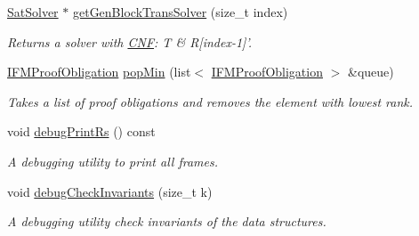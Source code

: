\begin{DoxyCompactItemize}
\hyperlink{classSatSolver}{Sat\-Solver} $\ast$ \hyperlink{classIFM13Synth_af087a4ddf9026bb48a752c03e539d9da}{get\-Gen\-Block\-Trans\-Solver} (size\-\_\-t index)
\begin{DoxyCompactList}\small\item\em Returns a solver with \hyperlink{classCNF}{C\-N\-F}\-: T \& R\mbox{[}index-\/1\mbox{]}'. \end{DoxyCompactList}\item 
\hyperlink{classIFMProofObligation}{I\-F\-M\-Proof\-Obligation} \hyperlink{classIFM13Synth_a6bd825fad36c8cd64afbc2b17fff8b69}{pop\-Min} (list$<$ \hyperlink{classIFMProofObligation}{I\-F\-M\-Proof\-Obligation} $>$ \&queue)
\begin{DoxyCompactList}\small\item\em Takes a list of proof obligations and removes the element with lowest rank. \end{DoxyCompactList}\item 
void \hyperlink{classIFM13Synth_a986f63c9895b2999fe2ed27e38df4b84}{debug\-Print\-Rs} () const 
\begin{DoxyCompactList}\small\item\em A debugging utility to print all frames. \end{DoxyCompactList}\item 
void \hyperlink{classIFM13Synth_a3957fbd604e2a188e924f39d62c4cab4}{debug\-Check\-Invariants} (size\-\_\-t k)
\begin{DoxyCompactList}\small\item\em A debugging utility check invariants of the data structures. \end{DoxyCompactList}\end{DoxyCompactItemize}
